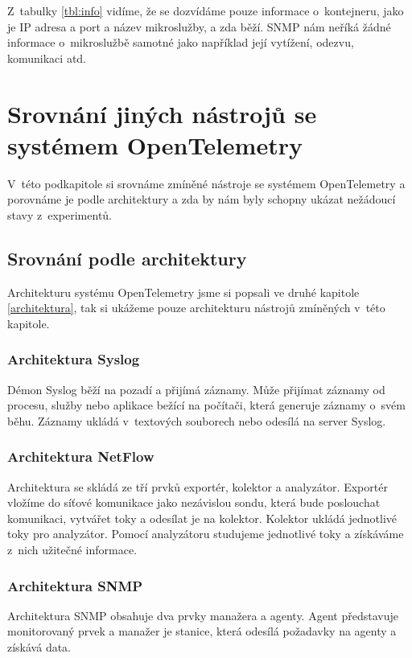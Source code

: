 Z~tabulky \ref{tbl:info} vidíme, že se dozvídáme pouze informace o~kontejneru, jako je IP adresa a port a název mikroslužby, a zda běží. SNMP nám neříká žádné informace o~mikroslužbě samotné jako například její vytížení, odezvu, komunikaci atd.

\section{Srovnání jiných nástrojů se systémem OpenTelemetry}

V~této podkapitole si srovnáme zmíněné nástroje se systémem OpenTelemetry a porovnáme je podle architektury a zda by nám byly schopny ukázat nežádoucí stavy z~experimentů.

\subsection{Srovnání podle architektury}

Architekturu systému OpenTelemetry jsme si popsali ve druhé kapitole \ref{architektura}, tak si ukážeme pouze architekturu nástrojů zmíněných v~této kapitole.

\subsubsection{Architektura Syslog}
Démon Syslog běží na pozadí a přijímá záznamy. Může přijímat záznamy od procesu, služby nebo aplikace bežící na počítači, která generuje záznamy o~svém běhu. Záznamy ukládá v~textových souborech nebo odesílá na server Syslog.

\subsubsection{Architektura NetFlow}
Architektura se skládá ze tří prvků exportér, kolektor a analyzátor. Exportér vložíme do síťové komunikace jako nezávislou sondu, která bude poslouchat komunikaci, vytvářet toky a odesílat je na kolektor. Kolektor ukládá jednotlivé toky pro analyzátor. Pomocí analyzátoru studujeme jednotlivé toky a získáváme z~nich užitečné informace.

\subsubsection{Architektura SNMP}
Architektura SNMP obsahuje dva prvky manažera a agenty. Agent představuje monitorovaný prvek a manažer je stanice, která odesílá požadavky na agenty a získává data.


